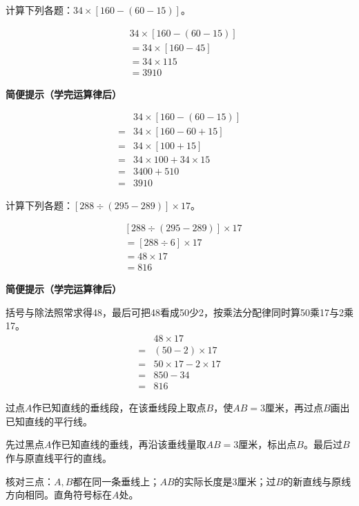 计算下列各题：\(34\times[160-(60-15)]\)。\par
\begin{BookAnswer}
\[\begin{aligned}&34\times[160-(60-15)]\\&=34\times[160-45]\\&=34\times115\\&=3910\end{aligned}\]\par\textbf{简便提示（学完运算律后）}\par \[\begin{aligned}&34\times[160-(60-15)]\\={}&34\times[160-60+15]\\={}&34\times[100+15]\\={}&34\times100+34\times15\\={}&3400+510\\={}&3910\end{aligned}\]
\end{BookAnswer}

计算下列各题：\([288\div(295-289)]\times17\)。\par
\begin{BookAnswer}
\[\begin{aligned}&[288\div(295-289)]\times17\\&=[288\div6]\times17\\&=48\times17\\&=816\end{aligned}\]\par\textbf{简便提示（学完运算律后）}\par 括号与除法照常求得48，最后可把48看成50少2，按乘法分配律同时算50乘17与2乘17。\[\begin{aligned}&48\times17\\={}&(50-2)\times17\\={}&50\times17-2\times17\\={}&850-34\\={}&816\end{aligned}\]
\end{BookAnswer}

过点\(A\)作已知直线的垂线段，在该垂线段上取点\(B\)，使\(AB=3\)厘米，再过点\(B\)画出已知直线的平行线。\par
{}
\begin{BookAnswer}
先过黑点\(A\)作已知直线的垂线，再沿该垂线量取\(AB=3\)厘米，标出点\(B\)。最后过\(B\)作与原直线平行的直线。\par 核对三点：\(A,B\)都在同一条垂线上；\allowbreak{}\(AB\)的实际长度是\(3\)厘米；过\(B\)的新直线与原线方向相同。直角符号标在\(A\)处。
\end{BookAnswer}

